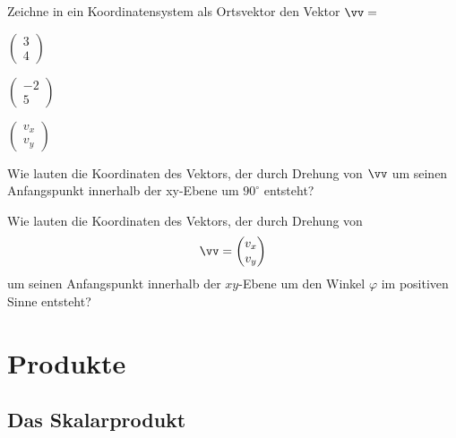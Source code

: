 \documentclass[%
11pt,%
twoside,%
titlepage,%
german,%
headsepline%
]{scrartcl}
\begin{document}
\begin{ueb}[Drehe!]
Zeichne in ein Koordinatensystem als Ortsvektor den Vektor  $\vv=$

\begin{minipage}{2.5cm}
\begin{enumeratea}
\item $\begin{pmatrix}3\\4\end{pmatrix}$
\end{enumeratea}
\end{minipage}
\begin{minipage}{2.5cm}
\begin{enumeratea}
\addtocounter{enumi}{1}
\item $\begin{pmatrix}-2\\5\end{pmatrix}$
\end{enumeratea}
\end{minipage}\begin{minipage}{2.5cm}
\begin{enumeratea}
\addtocounter{enumi}{2}
\item $\begin{pmatrix}v_x\\v_y\end{pmatrix}$
\end{enumeratea}
\end{minipage}

Wie lauten die Koordinaten des Vektors, der durch Drehung von $\vv$ um seinen Anfangspunkt innerhalb der xy-Ebene um $90^\circ$ entsteht?
\end{ueb}

\begin{ueb}
Wie
lauten die Koordinaten des Vektors, der durch
Drehung von
$$\vv=\begin{pmatrix}v_x\\v_y\end{pmatrix}$$
um seinen Anfangspunkt innerhalb der $xy$-Ebene um den Winkel $\varphi$ im positiven Sinne entsteht?
\end{ueb}

\section{Produkte}
\subsection{Das Skalarprodukt}
\end{document}
